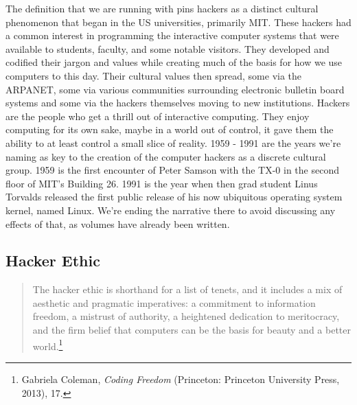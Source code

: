 \documentclass[11pt]{article}
\begin{document}
The definition that we are running with pins hackers as a distinct cultural phenomenon that began in the US universities, primarily MIT. These hackers had a common interest in programming the interactive computer systems that were available to students, faculty, and some notable visitors. They developed and codified their jargon and values while creating much of the basis for how we use computers to this day. Their cultural values then spread, some via the ARPANET, some via various communities surrounding electronic bulletin board systems and some via the hackers themselves moving to new institutions. Hackers are the people who get a thrill out of interactive computing. They enjoy computing for its own sake, maybe in a world out of control, it gave them the ability to at least control a small slice of reality. 1959 - 1991 are the years we're naming as key to the creation of the computer hackers as a discrete cultural group. 1959 is the first encounter of Peter Samson with the TX-0 in the second floor of MIT's Building 26. 1991 is the year when then grad student Linus Torvalds released the first public release of his now ubiquitous operating system kernel, named Linux. We're ending the narrative there to avoid discussing any effects of that, as volumes have already been written.

\subsection{Hacker Ethic}

\begin{quote}
The hacker ethic is shorthand for a list of tenets, and it includes a mix of aesthetic and pragmatic imperatives: a commitment to information freedom, a mistrust of authority, a heightened dedication to meritocracy, and the firm belief that computers can be the basis for beauty and a better world.\footnote{Gabriela Coleman, \emph{Coding Freedom} (Princeton: Princeton University Press, 2013), 17.}
\end{quote}
\end{document}
